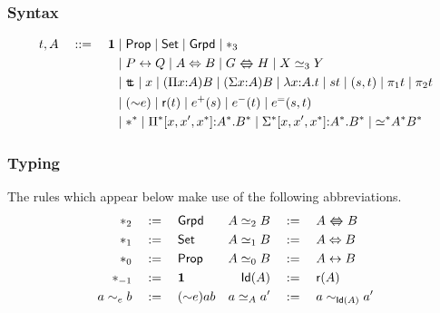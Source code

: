 \documentclass[12pt]{scrartcl}
\newcommand{\leqg}{{\lambda{\simeq}_2}}
\newcommand{\unitt}{{\boldsymbol{1}}}
\newcommand{\idof}[1]{\mathsf{Id}{(#1)}}
\newcommand{\props}{\mathsf{Prop}}
\newcommand{\sets}{\mathsf{Set}}
\newcommand{\grpds}{\mathsf{Grpd}}
\newcommand{\TLRA}{\Lleftarrow\!\!\!\!\!\Rrightarrow}
\newcommand{\gequiv}{\TLRA}
\begin{document}
\pagestyle{empty}
\thispagestyle{empty}
\section*{\fbox{$\boldsymbol{\leqg}$}}
\subsubsection*{Syntax}
\begin{align*}
  t, A \quad ::= \quad \unitt &\mid \props \mid \sets \mid \grpds \mid
  \sta_3\\
&\mid P \lra Q \mid A \LRA B \mid G \gequiv H \mid X \simeq_3 Y \\
&\mid \ttt \mid x \mid (\Pi x {:} A) B \mid (\Sigma x {:} A) B 
\mid \lambda x {:}A.t \mid s t \mid (s,t) \mid \pi_1 t \mid \pi_2 t \\
&\mid ({\sim}e) \mid \refl{t}\mid e^+(s) \mid e^-(t) \mid e^=(s,t)\\
&\mid \sta^{\sta} \mid \Pi^* [x,x',x^*] {:} A^*. B^*
\mid \Sigma^* [x,x',x^*] {:} A^*. B^*
\mid {\ee{}^*} A^* B^*
\end{align*}
\subsubsection*{Typing}
The rules which appear below make use of the following
abbreviations.
\begin{align*}
\sta_2 &\df \grpds &
A \simeq_2 B &\df A \gequiv B \\
\sta_1 &\df \sets &
A \simeq_1 B &\df A  \LRA B\\
\sta_0 &\df \props &
A \simeq_0 B &\df A \lra B\\
\sta_{-1} &\df \unitt &
\idof{A} &\df \refl{A}\\
 a \sim_e b &\df ({\sim} e) a b&
a \ee A a' &\df a \sim_{\idof{A}} a'\\
\end{align*}

\begin{prooftree}
\end{prooftree}
\end{document}
